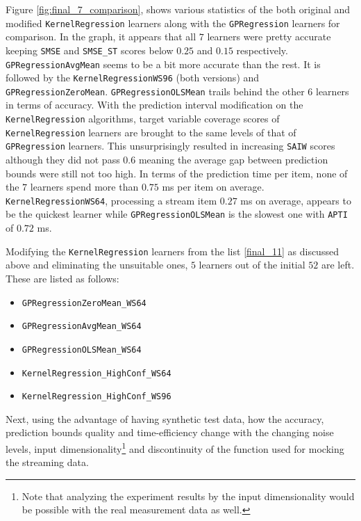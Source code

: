Figure \ref{fig:final_7_comparison}, shows various statistics of the both original and modified \texttt{KernelRegression} learners along with the \texttt{GPRegression} learners for comparison. In the graph, it appears that all $7$ learners were pretty accurate keeping \texttt{SMSE} and \texttt{SMSE\_ST} scores below $0.25$ and $0.15$ respectively. \texttt{GPRegressionAvgMean} seems to be a bit more accurate than the rest. It is followed by the \texttt{KernelRegressionWS96} (both versions) and \texttt{GPRegressionZeroMean}. \texttt{GPRegressionOLSMean} trails behind the other $6$ learners in terms of accuracy. With the prediction interval modification on the \texttt{KernelRegression} algorithms, target variable coverage scores of \texttt{KernelRegression} learners are brought to the same levels of that of \texttt{GPRegression} learners. This unsurprisingly resulted in increasing \texttt{SAIW} scores although they did not pass $0.6$ meaning the average gap between prediction bounds were still not too high. In terms of the prediction time per item, none of the $7$ learners spend more than $0.75$ ms per item on average. \texttt{KernelRegressionWS64}, processing a stream item $0.27$ ms on average, appears to be the quickest learner while \texttt{GPRegressionOLSMean} is the slowest one with \texttt{APTI} of $0.72$ ms.

Modifying the \texttt{KernelRegression} learners from the list \ref{final_11} as discussed above and eliminating the unsuitable ones, $5$ learners out of the initial $52$ are left. These are listed as follows:

\begin{itemize}
\label{final_5}
\item \texttt{GPRegressionZeroMean\_WS64}
\item \texttt{GPRegressionAvgMean\_WS64}
\item \texttt{GPRegressionOLSMean\_WS64}
\item \texttt{KernelRegression\_HighConf\_WS64}
\item \texttt{KernelRegression\_HighConf\_WS96}
\end{itemize}

Next, using the advantage of having synthetic test data, how the accuracy, prediction bounds quality and time-efficiency change with the changing noise levels, input dimensionality\footnote{Note that analyzing the experiment results by the input dimensionality would be possible with the real measurement data as well.} and discontinuity of the function used for mocking the streaming data.


